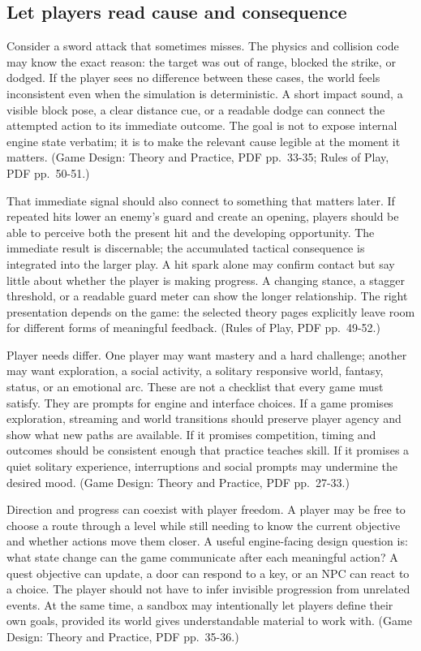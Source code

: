 \subsection{Let players read cause and consequence}\label{05-engine-i-ch009-let-players-read-cause-and-consequence}

Consider a sword attack that sometimes misses. The physics and collision code may know the exact reason: the target was out of range, blocked the strike, or dodged. If the player sees no difference between these cases, the world feels inconsistent even when the simulation is deterministic. A short impact sound, a visible block pose, a clear distance cue, or a readable dodge can connect the attempted action to its immediate outcome. The goal is not to expose internal engine state verbatim; it is to make the relevant cause legible at the moment it matters. (Game Design: Theory and Practice, PDF pp.~33-35; Rules of Play, PDF pp.~50-51.)

That immediate signal should also connect to something that matters later. If repeated hits lower an enemy's guard and create an opening, players should be able to perceive both the present hit and the developing opportunity. The immediate result is discernable; the accumulated tactical consequence is integrated into the larger play. A hit spark alone may confirm contact but say little about whether the player is making progress. A changing stance, a stagger threshold, or a readable guard meter can show the longer relationship. The right presentation depends on the game: the selected theory pages explicitly leave room for different forms of meaningful feedback. (Rules of Play, PDF pp.~49-52.)

Player needs differ. One player may want mastery and a hard challenge; another may want exploration, a social activity, a solitary responsive world, fantasy, status, or an emotional arc. These are not a checklist that every game must satisfy. They are prompts for engine and interface choices. If a game promises exploration, streaming and world transitions should preserve player agency and show what new paths are available. If it promises competition, timing and outcomes should be consistent enough that practice teaches skill. If it promises a quiet solitary experience, interruptions and social prompts may undermine the desired mood. (Game Design: Theory and Practice, PDF pp.~27-33.)

Direction and progress can coexist with player freedom. A player may be free to choose a route through a level while still needing to know the current objective and whether actions move them closer. A useful engine-facing design question is: what state change can the game communicate after each meaningful action? A quest objective can update, a door can respond to a key, or an NPC can react to a choice. The player should not have to infer invisible progression from unrelated events. At the same time, a sandbox may intentionally let players define their own goals, provided its world gives understandable material to work with. (Game Design: Theory and Practice, PDF pp.~35-36.)


